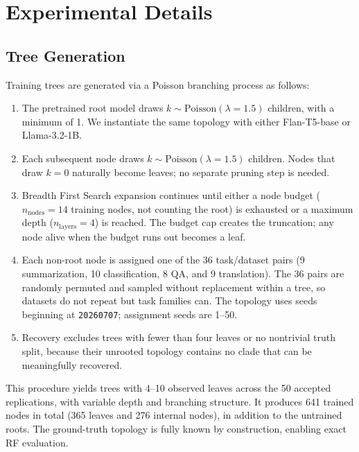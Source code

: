 \documentclass{article}
\theoremstyle{definition}
\theoremstyle{plain}
\begin{document}
\section{Experimental Details}
\label{app:details}

\subsection*{Tree Generation}
\label{app:tree-gen}

Training trees are generated via a Poisson branching process as follows:

\begin{enumerate}
    \item The pretrained root model draws $k \sim \mathrm{Poisson}(\lambda = 1.5)$ children, with a minimum of 1. We instantiate the same topology with either Flan-T5-base or Llama-3.2-1B.
    \item Each subsequent node draws $k \sim \mathrm{Poisson}(\lambda = 1.5)$ children. Nodes that draw $k = 0$ naturally become leaves; no separate pruning step is needed.
    \item Breadth First Search expansion continues until either a node budget ($n_\mathrm{nodes} = 14$ training nodes, not counting the root) is exhausted or a maximum depth ($n_\mathrm{layers} = 4$) is reached. The budget cap creates the truncation; any node alive when the budget runs out becomes a leaf.
    \item Each non-root node is assigned one of the 36 task/dataset pairs (9 summarization, 10 classification, 8 QA, and 9 translation). The 36 pairs are randomly permuted and sampled without replacement within a tree, so datasets do not repeat but task families can. The topology uses seeds beginning at \texttt{20260707}; assignment seeds are 1--50.
    \item Recovery excludes trees with fewer than four leaves or no nontrivial truth split, because their unrooted topology contains no clade that can be meaningfully recovered.
\end{enumerate}

This procedure yields trees with 4--10 observed leaves across the 50 accepted replications, with variable depth and branching structure. It produces 641 trained nodes in total (365 leaves and 276 internal nodes), in addition to the untrained roots. The ground-truth topology is fully known by construction, enabling exact RF evaluation.
\end{document}
